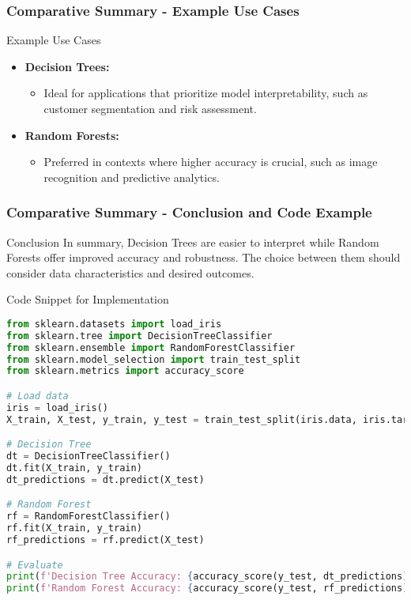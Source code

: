 \documentclass[aspectratio=169]{beamer}
\begin{document}
\begin{frame}[fragile]
    \frametitle{Comparative Summary - Example Use Cases}
    \begin{block}{Example Use Cases}
        \begin{itemize}
            \item \textbf{Decision Trees:} 
            \begin{itemize}
                \item Ideal for applications that prioritize model interpretability, such as customer segmentation and risk assessment.
            \end{itemize}
            \item \textbf{Random Forests:} 
            \begin{itemize}
                \item Preferred in contexts where higher accuracy is crucial, such as image recognition and predictive analytics.
            \end{itemize}
        \end{itemize}
    \end{block}
\end{frame}

\begin{frame}[fragile]
    \frametitle{Comparative Summary - Conclusion and Code Example}
    \begin{block}{Conclusion}
        In summary, Decision Trees are easier to interpret while Random Forests offer improved accuracy and robustness.
        The choice between them should consider data characteristics and desired outcomes.
    \end{block}
    
    \begin{block}{Code Snippet for Implementation}
        \begin{lstlisting}[language=Python]
from sklearn.datasets import load_iris
from sklearn.tree import DecisionTreeClassifier
from sklearn.ensemble import RandomForestClassifier
from sklearn.model_selection import train_test_split
from sklearn.metrics import accuracy_score

# Load data
iris = load_iris()
X_train, X_test, y_train, y_test = train_test_split(iris.data, iris.target, test_size=0.2)

# Decision Tree
dt = DecisionTreeClassifier()
dt.fit(X_train, y_train)
dt_predictions = dt.predict(X_test)

# Random Forest
rf = RandomForestClassifier()
rf.fit(X_train, y_train)
rf_predictions = rf.predict(X_test)

# Evaluate
print(f'Decision Tree Accuracy: {accuracy_score(y_test, dt_predictions)}')
print(f'Random Forest Accuracy: {accuracy_score(y_test, rf_predictions)}')
        \end{lstlisting}
    \end{block}
\end{frame}
\end{document}
